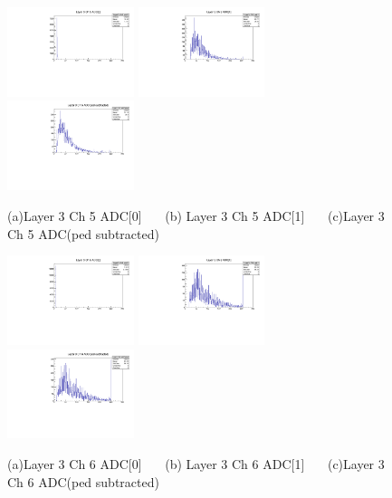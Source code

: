 \documentclass[a4paper,11pt]{article}
\theoremstyle{mytheor}
\begin{document}
\begin{figure}[H] 
\vspace*{-0.3cm} 
\includegraphics[width=0.33\textwidth,scale=0.5,trim=0 0 0 0,clip]{plotsdir/file0_muons-Layer3_Ch5_adc0-1.pdf} 
\includegraphics[width=0.33\textwidth,scale=0.5,trim=0 0 0 0,clip]{plotsdir/file0_muons-Layer3_Ch5_adc1-1.pdf} 
\includegraphics[width=0.33\textwidth,scale=0.5,trim=0 0 0 0,clip]{plotsdir/file0_muons-Layer3_Ch5_adcPedsub-1.pdf} 
\caption{(a)Layer 3 Ch 5 ADC[0] ~~~(b) Layer 3 Ch 5 ADC[1] ~~~(c)Layer 3 Ch 5 ADC(ped subtracted) } 
\end{figure} 
\begin{figure}[H] 
\vspace*{-0.3cm} 
\includegraphics[width=0.33\textwidth,scale=0.5,trim=0 0 0 0,clip]{plotsdir/file0_muons-Layer3_Ch6_adc0-1.pdf} 
\includegraphics[width=0.33\textwidth,scale=0.5,trim=0 0 0 0,clip]{plotsdir/file0_muons-Layer3_Ch6_adc1-1.pdf} 
\includegraphics[width=0.33\textwidth,scale=0.5,trim=0 0 0 0,clip]{plotsdir/file0_muons-Layer3_Ch6_adcPedsub-1.pdf} 
\caption{(a)Layer 3 Ch 6 ADC[0] ~~~(b) Layer 3 Ch 6 ADC[1] ~~~(c)Layer 3 Ch 6 ADC(ped subtracted) } 
\end{figure} 
\end{document}
